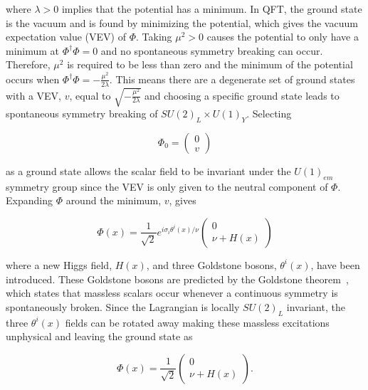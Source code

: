 \noindent
where $\lambda>0$ implies that the potential has a minimum. In QFT, the ground state is the vacuum and is found by minimizing the potential, which gives the vacuum expectation value (VEV) of $\Phi$. Taking $\mu^{2}>0$ causes the potential to only have a minimum at $\Phi^{\dag}\Phi=0$ and no spontaneous symmetry breaking can occur. Therefore, $\mu^{2}$ is required to be less than zero and the minimum of the potential occurs when $\Phi^{\dag}\Phi=-\frac{\mu^{2}}{2\lambda}$. This means there are a degenerate set of ground states with a VEV, $v$, equal to $\sqrt{-\frac{\mu^{2}}{2\lambda}}$ and choosing a specific ground state leads to spontaneous symmetry breaking of $SU(2)_{L}\times U(1)_{Y}$. Selecting 

\begin{equation}
\Phi_{0} =
\begin{pmatrix}
0\\
v
\end{pmatrix}
\end{equation}

\noindent
as a ground state allows the scalar field to be invariant under the $U(1)_{em}$ symmetry group since the VEV is only given to the neutral component of $\Phi$. Expanding $\Phi$ around the minimum, $v$, gives

\begin{equation}
\Phi(x) = \frac{1}{\sqrt{2}} e^{i\sigma_{i}\theta^{i}(x)/\nu}
\begin{pmatrix}
0\\
\nu+H(x)
\end{pmatrix}
\end{equation}

\noindent
where a new Higgs field, $H(x)$, and three Goldstone bosons, $\theta^{i}(x)$, have been introduced. These Goldstone bosons are predicted by the Goldstone theorem~\cite{GoldstoneThm}, which states that massless scalars occur whenever a continuous symmetry is spontaneously broken. Since the Lagrangian is locally $SU(2)_{L}$ invariant, the three $\theta^{i}(x)$ fields can be rotated away making these massless excitations unphysical and leaving the ground state as

\begin{equation}
\label{eq:GroundSt}
\Phi(x) = \frac{1}{\sqrt{2}}
\begin{pmatrix}
0\\
\nu+H(x)
\end{pmatrix}.
\end{equation}

